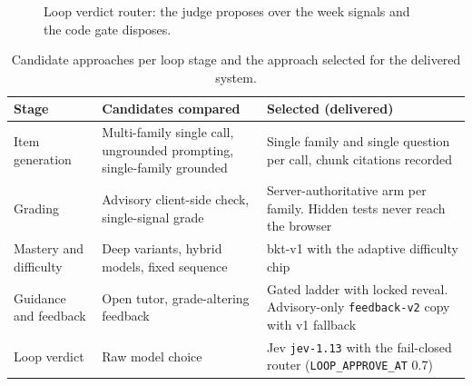 \begin{figure}[htbp]
\centering
{}
\caption{Loop verdict router: the judge proposes over the week signals and the code gate disposes.}
\label{fig:verdict-router}
\end{figure}

\begin{table}[htbp]
\centering
\footnotesize
\caption{Candidate approaches per loop stage and the approach selected for the delivered system.}
\label{tab:method-candidates}
\begin{tabular}{p{2.6cm} p{6.2cm} p{3.4cm}}
\toprule
\textbf{Stage} & \textbf{Candidates compared} & \textbf{Selected (delivered)} \\
\midrule
Item generation & Multi-family single call, ungrounded prompting, single-family grounded & Single family and single question per call, chunk citations recorded \\
 Grading & Advisory client-side check, single-signal grade & Server-authoritative arm per family. Hidden tests never reach the browser \\
Mastery and difficulty & Deep variants, hybrid models, fixed sequence & bkt-v1 with the adaptive difficulty chip \\
 Guidance and feedback & Open tutor, grade-altering feedback & Gated ladder with locked reveal. Advisory-only \texttt{feedback-v2} copy with v1 fallback \\
Loop verdict & Raw model choice & Jev \texttt{jev-1.13} with the fail-closed router (\texttt{LOOP\_APPROVE\_AT} 0.7) \\
\bottomrule
\end{tabular}
\end{table}

